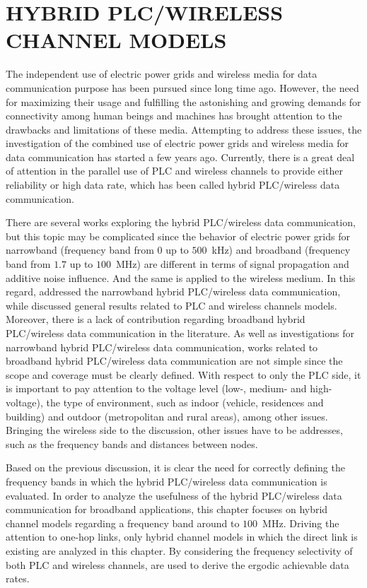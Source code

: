 \chapter{HYBRID PLC/WIRELESS CHANNEL MODELS}  \label{Hybrid}

The independent use of electric power grids and wireless media for data communication purpose has been pursued since long time ago. However, the need for maximizing their usage and fulfilling the astonishing and growing demands for connectivity among human beings and machines has brought attention to the drawbacks and limitations of these media. Attempting to address these issues, the investigation of the combined use of electric power grids and wireless media for data communication has started a few years ago. Currently, there is a great deal of attention in the parallel use of \ac{PLC} and wireless channels to provide either reliability or high data rate, which has been called hybrid PLC/wireless data communication. 

There are several works exploring the hybrid PLC/wireless data communication, but this topic may be complicated since the behavior of electric power grids for narrowband (frequency band from $0$ up to $500$~kHz) and broadband (frequency band from $1.7$ up to $100$~MHz) are different in terms of signal propagation and additive noise influence. And the same is applied to the wireless medium. In this regard, \cite{Victor2017,Leo2017,Victor2018} addressed the narrowband hybrid PLC/wireless data communication, while \cite{Lai2012,Sayed2014,Lai2010} discussed general results related to \ac{PLC} and wireless channels models. Moreover, there is a lack of contribution regarding broadband hybrid \ac{PLC}/wireless data communication in the literature. As well as investigations for narrowband hybrid \ac{PLC}/wireless data communication, works related to broadband hybrid \ac{PLC}/wireless data communication are not simple since the scope and coverage must be clearly defined. With respect to only the \ac{PLC} side, it is important to pay attention to the voltage level (low-, medium- and high-voltage), the type of environment, such as indoor (vehicle, residences and building) and outdoor (metropolitan and rural areas), among other issues. Bringing the wireless side to the discussion, other issues have to be addresses, such as the frequency bands and distances between nodes. 

Based on the previous discussion, it is clear the need for correctly defining the frequency bands in which the hybrid \ac{PLC}/wireless data communication is evaluated. In order to analyze the usefulness of the hybrid \ac{PLC}/wireless data communication for broadband applications, this chapter focuses on hybrid channel models regarding a frequency band around to $100$~MHz. Driving the attention to one-hop links, only hybrid channel models in which the direct link is existing are analyzed in this chapter. By considering the frequency selectivity of both \ac{PLC} and wireless channels, \cite{Goldsmith2001, Choudhuri2014} are used to derive the ergodic achievable data rates.

